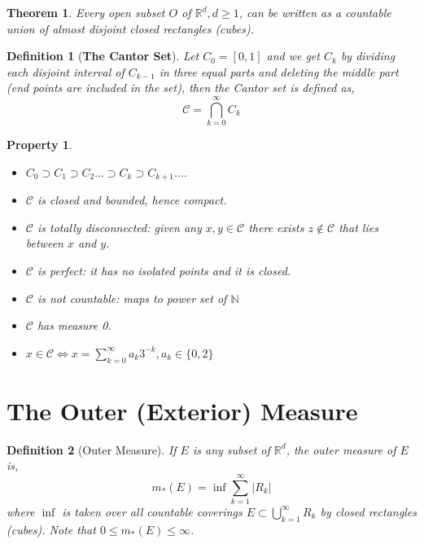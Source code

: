 \documentclass{report}
\theoremstyle{upthm}
\newtheorem{thm}{Theorem}
\newtheorem{defn}{Definition}
\newtheorem{property}{Property}
\newcommand{\reals}{\mathbb{R}}
\newcommand{\naturals}{\mathbb{N}}
\newcommand{\calC}{{\mathcal{C}}}
\newcommand{\tb}[1]{{\textbf{#1}}}
\newcommand{\set}[1]{\big\lbrace #1 \big\rbrace}
\newcommand{\union}{\bigcup}
\newcommand{\vl}{\Big|}
\newcommand{\intersection}{\bigcap}
\begin{document}
\begin{thm}
	Every open subset $O$ of $\reals^d, d \geq 1$, can be written as a countable union of almost disjoint closed rectangles (cubes).
\end{thm}

\begin{defn}[\tb{The Cantor Set}]
	Let $C_0 = [0, 1]$ and we get $C_k$ by dividing each disjoint interval of $C_{k-1}$ in three equal parts and deleting the middle part (end points are included in the set), then the Cantor set is defined as,
	$$ \calC =  \intersection_{k=0}^{\infty} C_k$$
\end{defn}
\begin{property}\item
	\begin{itemize}
		\item $C_0 \supset C_1 \supset C_2 \dots \supset C_k \supset C_{k+1} \dots$.
		\item $\calC$ is closed and	bounded, hence compact. 
		\item $\calC$ is totally disconnected: given any $x, y \in \calC$ there exists $z \notin \calC$ that lies between $x$ and $y$. 
		\item $\calC$ is perfect: it has no isolated points and it is closed.
		\item $\calC$ is not countable: maps to power set of $\naturals$
		\item $\calC$ has measure 0.
		\item $x \in \calC \iff x = \sum_{k=0}^{\infty} a_k 3^{-k}, a_k \in \set{0, 2}$ 
	\end{itemize}
\end{property}

\section{The Outer (Exterior) Measure}

\begin{defn}[Outer Measure]
	If $E$ is any subset of $\reals^d$, the	outer measure of $E$ is,
	$$m_{*}(E) = \inf \sum_{k=1}^{\infty} \vl R_k \vl $$
	where $\inf$ is taken over all countable coverings $E \subset \union_{k=1}^{\infty} R_k$ by closed rectangles (cubes). Note that $0 \leq m_*(E) \leq \infty$.
\end{defn}
\end{document}
